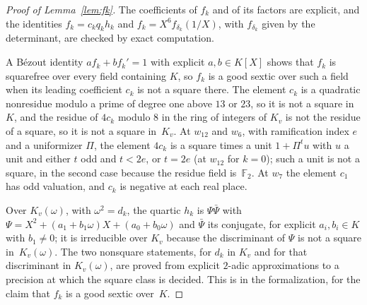 \documentclass[11pt]{amsart}
\theoremstyle{definition}
\numberwithin{equation}{section}
\newcommand{\F}{\mathbb{F}}
\newcommand{\kv}{K_v}
\begin{document}
\begin{proof}[Proof of Lemma~\ref{lem:fk}]
The coefficients of $f_k$ and of its factors are explicit, and the identities $f_k=c_kq_kh_k$ and $f_k=X^6f_{\delta_k}(1/X)$, with $f_{\delta_k}$ given by the determinant, are checked by exact computation.

A B\'ezout identity $af_k+bf_k'=1$ with explicit $a,b\in K[X]$ shows that $f_k$ is squarefree over every field containing $K$, so $f_k$ is a good sextic over such a field when its leading coefficient $c_k$ is not a square there. The element $c_k$ is a quadratic nonresidue modulo a prime of degree one above $13$ or $23$, so it is not a square in $K$, and the residue of $4c_k$ modulo $8$ in the ring of integers of $\kv$ is not the residue of a square, so it is not a square in~$\kv$. At $w_{12}$ and $w_6$, with ramification index $e$ and a uniformizer $\Pi$, the element $4c_k$ is a square times a unit $1+\Pi^tu$ with $u$ a unit and either $t$ odd and $t<2e$, or $t=2e$ (at $w_{12}$ for $k=0$); such a unit is not a square, in the second case because the residue field is~$\F_2$. At $w_7$ the element $c_1$ has odd valuation, and $c_k$ is negative at each real place.

Over $\kv(\omega)$, with $\omega^2=d_k$, the quartic $h_k$ is $\Psi\bar\Psi$ with $\Psi=X^2+(a_1+b_1\omega)X+(a_0+b_0\omega)$ and $\bar\Psi$ its conjugate, for explicit $a_i,b_i\in K$ with $b_1\neq0$; it is irreducible over $\kv$ because the discriminant of $\Psi$ is not a square in~$\kv(\omega)$. The two nonsquare statements, for $d_k$ in $\kv$ and for that discriminant in $\kv(\omega)$, are proved
 from explicit $2$-adic approximations to a precision at which the square class is decided. This is  in the formalization, for the claim that $f_k$ is a good sextic over~$K$.
\end{proof}
\end{document}
